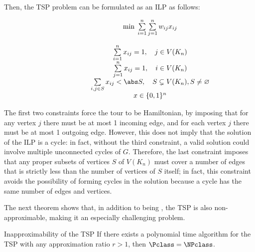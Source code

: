 \documentclass[a4paper, 12pt]{report}
\begin{document}
    Then, the TSP problem can be formulated as an ILP as follows:

    \[\begin{array}{ccc}
        \qquad\qquad\quad
        & \min \; \sum\limits_{i = 1}^n {\sum\limits_{j = 1}^n {w_{ij}x_{ij}}} \\\\
        & \sum\limits_{i = 1}^n {x_{ij}} = 1, \quad j \in V(K_n) \\
        & \sum\limits_{j = 1}^n {x_{ij}} = 1, \quad i \in V(K_n) \\
        & \sum\limits_{i, j \in S} {x_{ij}} < \abs S, \quad S \subsetneq V(K_n), S \neq \varnothing \\
        & x \in \{0,1\}^n
    \end{array}\]

    The first two constraints force the tour to be Hamiltonian, by imposing that for any vertex $j$ there must be at most 1 incoming edge, and for each vertex $j$ there must be at most 1 outgoing edge. However, this does not imply that the solution of the ILP is a cycle: in fact, without the third constraint, a valid solution could involve multiple unconnected cycles of $G$. Therefore, the last constraint imposes that any proper subsets of vertices $S$ of $V(K_n)$ must cover a number of edges that is strictly less than the number of vertices of $S$ itself; in fact, this constraint avoids the possibility of forming cycles in the solution because a cycle has the same number of edges and vertices.

    The next theorem shows that, in addition to being \NPComplete, the TSP is also non-approximable, making it an especially challenging problem.

    \begin{framedthm}{Inapproximability of the TSP}
        If there exists a polynomial time algorithm for the TSP with any approximation ratio $r > 1$, then $\Pclass = \NPclass$.
    \end{framedthm}
\end{document}
